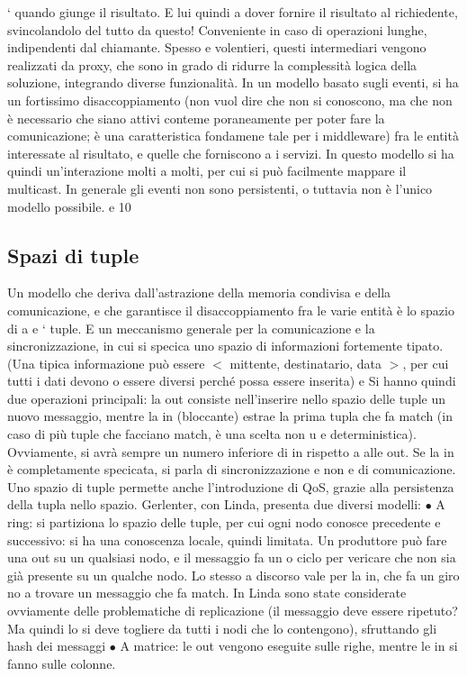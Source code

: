 `
quando giunge il risultato. E lui quindi a dover fornire il risultato al
richiedente, svincolandolo del tutto da questo! Conveniente in caso di
operazioni lunghe, indipendenti dal chiamante.
Spesso e volentieri, questi intermediari vengono realizzati da proxy, che sono in
grado di ridurre la complessità logica della soluzione, integrando diverse funzionalità.
In un modello basato sugli eventi, si ha un fortissimo disaccoppiamento (non
vuol dire che non si conoscono, ma che non è necessario che siano attivi conteme
poraneamente per poter fare la comunicazione; è una caratteristica fondamene
tale per i middleware) fra le entità interessate al risultato, e quelle che forniscono
a
i servizi. In questo modello si ha quindi un'interazione molti a molti, per cui si
può facilmente mappare il multicast. In generale gli eventi non sono persistenti,
o
tuttavia non è l'unico modello possibile.
e
10
\subsection{Spazi di tuple}
Un modello che deriva dall'astrazione della memoria condivisa e della comunicazione, e che garantisce il
disaccoppiamento fra le varie entità è lo spazio di
a e
`
tuple. E un meccanismo generale per la comunicazione e la sincronizzazione, in
cui si specica uno spazio di informazioni fortemente tipato. (Una tipica informazione può essere $<$ mittente,
destinatario, data $>$, per cui tutti i dati devono
o
essere diversi perché possa essere inserita)
e
Si hanno quindi due operazioni principali: la out consiste nell'inserire nello
spazio delle tuple un nuovo messaggio, mentre la in (bloccante) estrae la prima
tupla che fa match (in caso di più tuple che facciano match, è una scelta non
u
e
deterministica). Ovviamente, si avrà sempre un numero inferiore di in rispetto
a
alle out. Se la in è completamente specicata, si parla di sincronizzazione e non
e
di comunicazione. Uno spazio di tuple permette anche l'introduzione di QoS,
grazie alla persistenza della tupla nello spazio.
Gerlenter, con Linda, presenta due diversi modelli:
$\bullet$ A ring: si partiziona lo spazio delle tuple, per cui ogni nodo conosce
precedente e successivo: si ha una conoscenza locale, quindi limitata. Un
produttore può fare una out su un qualsiasi nodo, e il messaggio fa un
o
ciclo per vericare che non sia già presente su un qualche nodo. Lo stesso
a
discorso vale per la in, che fa un giro no a trovare un messaggio che fa
match. In Linda sono state considerate ovviamente delle problematiche
di replicazione (il messaggio deve essere ripetuto? Ma quindi lo si deve
togliere da tutti i nodi che lo contengono), sfruttando gli hash dei messaggi
$\bullet$ A matrice: le out vengono eseguite sulle righe, mentre le in si fanno sulle
colonne.
